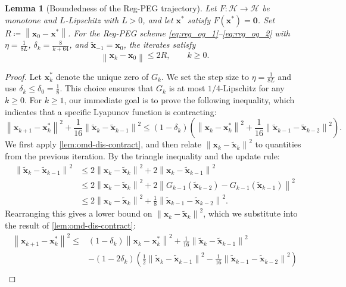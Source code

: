 \documentclass[letterpaper,11pt]{article}
\newcommand{\norm}[1]{\left\| #1 \right\|}
\newcommand{\vect}[1]{\mathbf{#1}}
\newtheorem{lemma}{Lemma}
\begin{document}
\begin{lemma}[Boundedness of the Reg-PEG trajectory]\label{lem:reg-og-traj-bound}
Let \(F:\mathcal H\to\mathcal H\) be monotone and \(L\)-Lipschitz with \(L>0\), and let \(\vect{x}^*\) satisfy \(F(\vect{x}^*)=\vect{0}\). Set \(R\coloneqq\norm{\vect{x}_0-\vect{x}^*}\). For the Reg-PEG scheme \eqref{eq:reg_og_1}--\eqref{eq:reg_og_2} with \(\eta=\frac{1}{8L}\), \(\delta_k=\frac{8}{k+64}\), and \(\tilde{\vect{x}}_{-1}=\vect{x}_0\), the iterates satisfy
\[
    \norm{\vect{x}_k-\vect{x}_0}\le 2R,\qquad k\ge0.
\]
\end{lemma}
\begin{proof}
Let \(\vect{x}_k^*\) denote the unique zero of \(G_k\). We set the step size to $\eta = \frac{1}{8L}$ and use $\delta_k \le \delta_0 = \frac{1}{8}$. This choice ensures that $G_k$ is at most $1/4$-Lipschitz for any $k \ge 0$. For \(k\ge1\), our immediate goal is to prove the following inequality, which indicates that a specific Lyapunov function is contracting:
$$
\norm{\vect{x}_{k+1} - \vect{x}_k^*}^2 + \frac{1}{16} \norm{\tilde{\vect{x}}_k - \tilde{\vect{x}}_{k-1}}^2 \le \left(1 - \delta_k\right) \left( \norm{\vect{x}_{k} - \vect{x}_k^*}^2 + \frac{1}{16} \norm{\tilde{\vect{x}}_{k-1} - \tilde{\vect{x}}_{k-2}}^2 \right).
$$
We first apply \cref{lem:omd-dis-contract}, and then relate $\norm{\vect{x}_k - \tilde{\vect{x}}_k}^2$ to quantities from the previous iteration. By the triangle inequality and the update rule:
\begin{align*}
\norm{\tilde{\vect{x}}_k - \tilde{\vect{x}}_{k-1}}^2 &\le 2\norm{\vect{x}_k - \tilde{\vect{x}}_k}^2 + 2\norm{\vect{x}_k - \tilde{\vect{x}}_{k-1}}^2 \\
&\le 2\norm{\vect{x}_k - \tilde{\vect{x}}_k}^2 + 2\norm{G_{k-1}(\tilde{\vect{x}}_{k-2}) - G_{k-1}(\tilde{\vect{x}}_{k-1})}^2 \\
&\le 2\norm{\vect{x}_k - \tilde{\vect{x}}_k}^2 + \frac{1}{8} \norm{\tilde{\vect{x}}_{k-1} - \tilde{\vect{x}}_{k-2}}^2.
\end{align*}
Rearranging this gives a lower bound on $\norm{\vect{x}_k - \tilde{\vect{x}}_k}^2$, which we substitute into the result of \cref{lem:omd-dis-contract}:
\begin{align*}
\norm{\vect{x}_{k+1} - \vect{x}_k^*}^2 \le{}& \left(1-\delta_k\right)\norm{\vect{x}_k - \vect{x}_k^*}^2 + \frac{1}{16}\norm{\tilde{\vect{x}}_k - \tilde{\vect{x}}_{k-1}}^2 \\
& - \left(1-2\delta_k\right)\left(\frac{1}{2}\norm{\tilde{\vect{x}}_k - \tilde{\vect{x}}_{k-1}}^2 - \frac{1}{16}\norm{\tilde{\vect{x}}_{k-1} - \tilde{\vect{x}}_{k-2}}^2\right) \\

\end{align*}
\end{proof}
\end{document}
